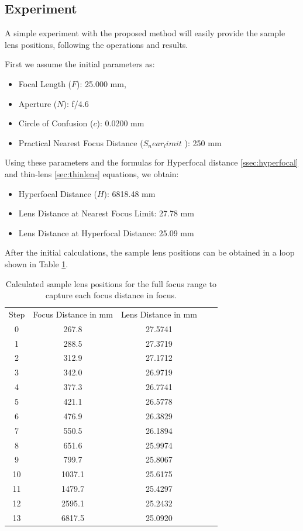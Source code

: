 \documentclass{article}
\begin{document}
\subsection{Experiment}
\label{sec:experiment}
A simple experiment with the proposed method will easily provide the sample lens positions, following the operations and results.

First we assume the initial parameters as: 

\begin{itemize}
    \item Focal Length (\( F\)): 25.000 mm,
    \item Aperture (\( N\)): f/4.6
    \item Circle of Confusion (\( c\)): 0.0200 mm
    \item Practical Nearest Focus Distance (\( S_near_limit\) ): 250 mm
\end{itemize}

Using these parameters and the formulas for Hyperfocal distance \ref{ssec:hyperfocal} and thin-lens \ref{sec:thinlens} equations, we obtain: 

\begin{itemize}
    \item Hyperfocal Distance (\( H\)): 6818.48 mm
    \item Lens Distance at Nearest Focus Limit: 27.78 mm
    \item Lens Distance at Hyperfocal Distance: 25.09 mm
\end{itemize}

After the initial calculations, the sample lens positions can be obtained in a loop shown in  Table \ref{tab:samplelenspos}.

\begin{table}
    \centering
    \begin{tabular}{ccccc}
        Step & Focus Distance in mm & Lens Distance in mm\\
        0&267.8&27.5741\\
        1&288.5&27.3719\\
        2&312.9&27.1712\\
        3&342.0&26.9719\\
        4&377.3&26.7741\\
        5&421.1&26.5778\\
        6&476.9&26.3829\\
        7&550.5&26.1894\\
        8&651.6&25.9974\\
        9&799.7&25.8067\\
        10&1037.1&25.6175\\
        11&1479.7&25.4297\\
        12&2595.1&25.2432\\
        13&6817.5&25.0920\\
    \end{tabular}
    \caption{Calculated sample lens positions for the full focus range to capture each focus distance in focus.}
    \label{tab:samplelenspos}
\end{table}
\end{document}
